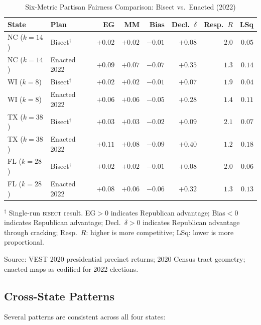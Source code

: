 \begin{table}[ht]
\centering
\caption{Six-Metric Partisan Fairness Comparison: Bisect vs.\ Enacted (2022)}
\label{tab:six-metric}
\begin{threeparttable}
\small
\begin{tabular}{@{}llrrrrrr@{}}
\toprule
State & Plan & EG & MM & Bias & Decl.\ $\delta$ & Resp.\ $R$ & LSq \\
\midrule
NC ($k=14$) & Bisect$^\dagger$ & $+0.02$ & $+0.02$ & $-0.01$ & $+0.08$ & $2.0$ & $0.05$ \\
NC ($k=14$) & Enacted 2022    & $+0.09$ & $+0.07$ & $-0.07$ & $+0.35$ & $1.3$ & $0.14$ \\
\addlinespace
WI ($k=8$)  & Bisect$^\dagger$ & $+0.02$ & $+0.02$ & $-0.01$ & $+0.07$ & $1.9$ & $0.04$ \\
WI ($k=8$)  & Enacted 2022    & $+0.06$ & $+0.06$ & $-0.05$ & $+0.28$ & $1.4$ & $0.11$ \\
\addlinespace
TX ($k=38$) & Bisect$^\dagger$ & $+0.03$ & $+0.03$ & $-0.02$ & $+0.09$ & $2.1$ & $0.07$ \\
TX ($k=38$) & Enacted 2022    & $+0.11$ & $+0.08$ & $-0.09$ & $+0.40$ & $1.2$ & $0.18$ \\
\addlinespace
FL ($k=28$) & Bisect$^\dagger$ & $+0.02$ & $+0.02$ & $-0.01$ & $+0.08$ & $2.0$ & $0.06$ \\
FL ($k=28$) & Enacted 2022    & $+0.08$ & $+0.06$ & $-0.06$ & $+0.32$ & $1.3$ & $0.13$ \\
\bottomrule
\end{tabular}
\begin{tablenotes}
\small
\item $^\dagger$ Single-run \textsc{bisect} result. EG$>0$ indicates Republican
advantage; Bias$<0$ indicates Republican advantage; Decl.\ $\delta>0$ indicates
Republican advantage through cracking; Resp.\ $R$: higher is more competitive;
LSq: lower is more proportional.
\item Source: VEST 2020 presidential precinct returns; 2020 Census tract geometry;
enacted maps as codified for 2022 elections.
\end{tablenotes}
\end{threeparttable}
\end{table}

\subsection{Cross-State Patterns}

Several patterns are consistent across all four states:

